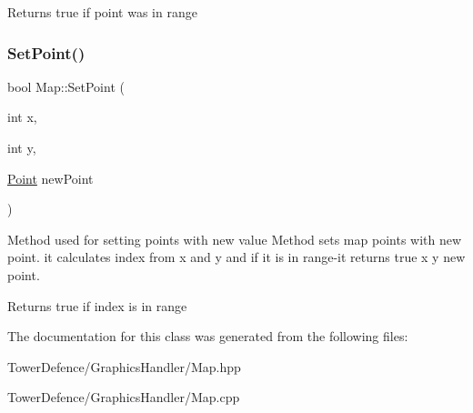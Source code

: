 \begin{DoxyReturn}{Returns}
true if point was in range 
\end{DoxyReturn}
\mbox{\label{class_map_aa1133d277379166a0f4703b6e17849c1}} 
\subsubsection{\texorpdfstring{Set\+Point()}{SetPoint()}\hspace{0.1cm}{\footnotesize\ttfamily [3/3]}}
{\footnotesize\ttfamily bool Map\+::\+Set\+Point (\begin{DoxyParamCaption}\item[{int}]{x,  }\item[{int}]{y,  }\item[{\mbox{\hyperlink{class_point}{Point}}}]{new\+Point }\end{DoxyParamCaption})}



Method used for setting points with new value Method sets map points with new point. it calculates index from x and y and if it is in range-\/it returns true  x  y  new point. 

\begin{DoxyReturn}{Returns}
true if index is in range 
\end{DoxyReturn}


The documentation for this class was generated from the following files\+:\begin{DoxyCompactItemize}
\item 
Tower\+Defence/\+Graphics\+Handler/Map.\+hpp\item 
Tower\+Defence/\+Graphics\+Handler/Map.\+cpp\end{DoxyCompactItemize}
